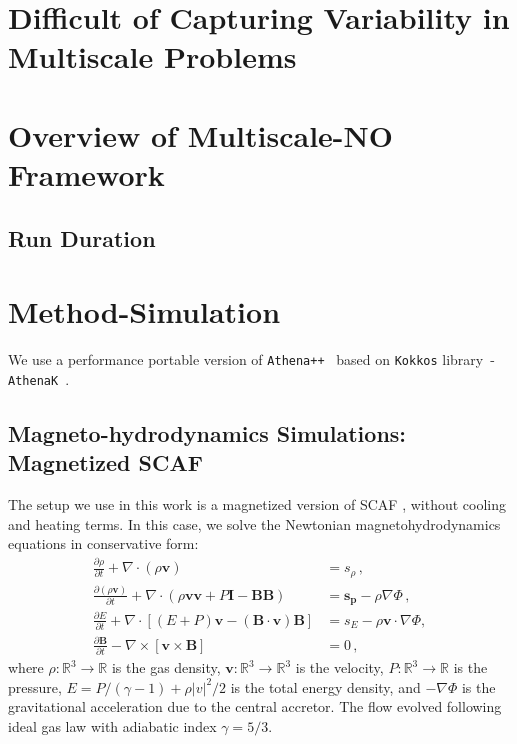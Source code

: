 \documentclass{article}
\begin{document}
\section{Difficult of Capturing Variability in Multiscale Problems}
\label{sec:variability}
                                                                                                                                 

\section{Overview of Multiscale-NO Framework}
\label{sec:overview}

\subsection{Run Duration}


\section{Method-Simulation}
\label{sec:method-simulation}

We use a performance portable version of \texttt{Athena++}~\cite{Stone2020} based on \texttt{Kokkos} library~\cite{Trott2021}-\texttt{AthenaK}~\cite{athenak}.

\subsection{Magneto-hydrodynamics Simulations: Magnetized SCAF}
The setup we use in this work is a magnetized version of SCAF \cite{Guo2024}, without cooling and heating terms. 
In this case, we solve the Newtonian magnetohydrodynamics equations in conservative form:
\begin{align}
    \frac{\partial \rho}{\partial t}+\nabla \cdot(\rho \boldsymbol{v}) &=s_{\rho}\,, \\
    \frac{\partial(\rho \boldsymbol{v})}{\partial t}+\nabla \cdot(\rho \boldsymbol{v} \boldsymbol{v} + P \boldsymbol{I}  - \boldsymbol{B}\boldsymbol{B})&=\boldsymbol{s_p}-\rho \nabla \Phi\,, \\
    \frac{\partial E}{\partial t}+\nabla \cdot[(E+{P}) \boldsymbol{v} - \left(\boldsymbol{B}\cdot \boldsymbol{v}\right) \boldsymbol{B}]&=s_E-\rho \boldsymbol{v} \cdot \nabla \Phi,\\
    \frac{\partial \boldsymbol{B}}{\partial t}-\nabla \times [ \boldsymbol{v} \times \boldsymbol{B} ]&=0\,,
\end{align}
where $\rho:\mathbb{R}^3\to\mathbb{R}$ is the gas density, $\boldsymbol{v}:\mathbb{R}^3\to\mathbb{R}^3$ is the velocity, $P:\mathbb{R}^3\to\mathbb{R}$ is the pressure, $E=P/(\gamma-1)+\rho |v|^2/2$ is the total energy density, and $-\nabla\Phi$ is the gravitational acceleration due to the central accretor. The flow evolved following ideal gas law with adiabatic index $\gamma=5/3$.
\end{document}
